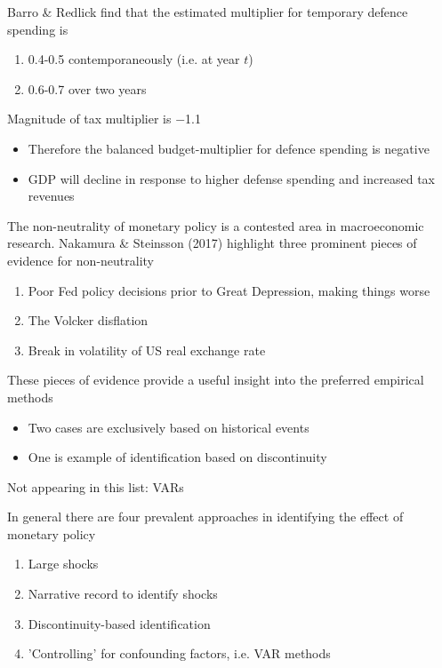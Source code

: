 \documentclass{beamer}
\begin{document}
\begin{frame}
  Barro \& Redlick find that the estimated multiplier for temporary defence spending is
 \begin{enumerate}
   \item 0.4-0.5 contemporaneously (i.e. at year $t$)
   \item 0.6-0.7 over two years
 \end{enumerate}
 \medskip
 Magnitude of tax multiplier is $-$1.1
 \begin{itemize}
   \item Therefore the balanced budget-multiplier for defence spending is negative
   \item GDP will decline in response to higher defense spending and increased tax revenues
 \end{itemize}     
\end{frame}

\begin{frame}
 The non-neutrality of monetary policy is a contested area in macroeconomic research.  
 Nakamura \& Steinsson (2017) highlight three prominent pieces of evidence for non-neutrality
 \medskip
 \begin{enumerate}
   \item Poor Fed policy decisions prior to Great Depression, making things worse
   \item The Volcker disflation
   \item Break in volatility of US real exchange rate
 \end{enumerate} 
\end{frame}

\begin{frame}
  These pieces of evidence provide a useful insight into the preferred empirical methods
  \medskip  
  \begin{itemize}
    \item Two cases are exclusively based on historical events
    \item One is example of identification based on discontinuity
  \end{itemize}
  \medskip
  Not appearing in this list: VARs
\end{frame}

\begin{frame}
  In general there are four prevalent approaches in identifying the effect of monetary policy
  \begin{enumerate}
    \item Large shocks
    \item Narrative record to identify shocks
    \item Discontinuity-based identification    
    \item 'Controlling' for confounding factors, i.e. VAR methods
  \end{enumerate}
\end{frame}
\end{document}
